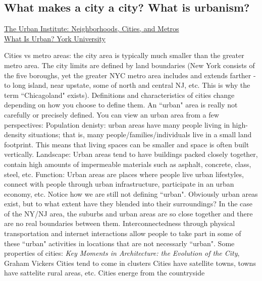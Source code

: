 \documentclass{article}
\begin{document}
        \subsection{What makes a city a city? What is urbanism?}
        \small{\href{https://www.urban.org/urban-wire/what-defines-city}{The Urban Institute: Neighborhoods, Cities, and Metros}}\\
        \small{\href{https://www.yorku.ca/anderson/Intro%20Urban%20Studies/Unit1/what_is_urban.htm}{What Is Urban? York University}}
        \normalsize
        \begin{outline}
            \1 Cities vs metro areas: the city area is typically much smaller than the greater metro area. The city limits are defined by land boundaries (New York consists of the five boroughs, yet the greater NYC metro area includes and extends farther - to long island, near upstate, some of north and central NJ, etc. This is why the term ``Chicagoland" exists). 
            \1 Definitions and characteristics of cities change depending on how you choose to define them. 
            \1 An ``urban" area is really not carefully or precisely defined. You can view an urban area from a few perspectives:
                \2 Population denisty: urban areas have many people living in high-density situations; that is, many people/families/individuals live in a small land footprint. This means that living spaces can be smaller and space is often built vertically. 
                \2 Landscape: Urban areas tend to have buildings packed closely together, contain high amounts of impermeable materials such as asphalt, concrete, class, steel, etc. 
                \2 Function: Urban areas are places where people live urban lifestyles, connect with people through urban infrastructure, participate in an urban economy, etc. Notice how we are still not defining ``urban". 
            \1 Obviously urban areas exist, but to what extent have they blended into their surroundings? In the case of the NY/NJ area, the suburbs and urban areas are so close together and there are no real boundaries between them. Interconnectedness through physical transportation and internet interactions allow people to take part in some of these ``urban" activities in locations that are not necessarly ``urban". 
            \1 Some properties of cities: 
        \0 \small{\textit{Key Moments in Architecture: the Evolution of the City}, Graham Vickers}
            \1 Cities tend to come in clusters 
                \2 Cities have satellite towns, towns have sattelite rural areas, etc. 
            \1 Cities energe from the countryside

\end{outline}
\end{document}
